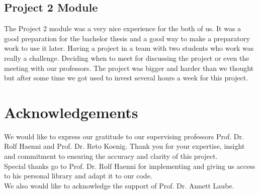 \documentclass{article}
\begin{document}
\subsection{Project 2 Module}
The Project 2 module was a very nice experience for the both of us. It was a good preparation for the bachelor thesis and a good way to make a preparatory work to use it later. Having a project in a team with two students who work was really a challenge. Deciding when to meet for discussing the project or even the meeting with our professors. The project was bigger and harder than we thought but after some time we got used to invest several hours a week for this project.

\section*{Acknowledgements}
We would like to express our gratitude to our supervising professors Prof. Dr. Rolf Haenni and Prof. Dr. Reto Koenig. Thank you for your expertise, insight and commitment to ensuring the accuracy and clarity of this project. \\
Special thanks go to Prof. Dr. Rolf Haenni for implementing and giving us access to his personal library and adapt it to our code. \\
We also would like to acknowledge the support of Prof. Dr. Annett Laube. \newpage

\clearpage
\printglossaries
\printbibliography
\end{document}
